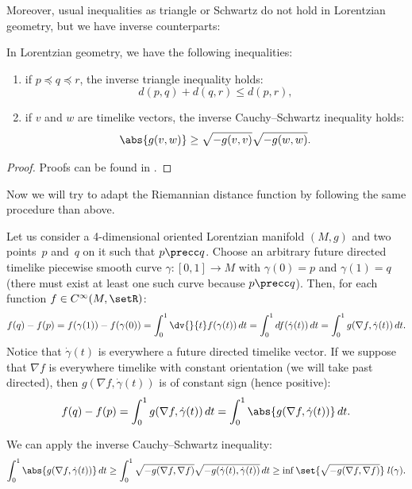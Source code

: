 Moreover, usual inequalities as triangle or Schwartz do not hold in Lorentzian geometry, but we have inverse counterparts:

\begin{lemma}
In Lorentzian geometry, we have the following inequalities:
\begin{enumerate}\itemsep=0pt
\item if $p \preceq q \preceq r$, the inverse triangle inequality holds:
\[
d(p,q) + d(q,r) \leq d(p,r),
\]
\item if $v$ and $w$ are timelike vectors, the inverse Cauchy--Schwartz inequality holds:
\[
\abs{g(v,w)} \geq \sqrt{- g(v,v)} \sqrt{- g(w,w)}.
\]
\end{enumerate}
\end{lemma}

\begin{proof}
Proofs can be found in \cite{Beem,ONeill}.
\end{proof}

Now we will try to adapt the Riemannian distance function by following the same procedure than above.

Let us consider a 4-dimensional oriented Lorentzian manifold $(M,g)$ and two points~$p$ and~$q$ on it such that $p \precc q$. Choose an arbitrary future directed timelike piecewise smooth curve $\gamma : [0,1] \rightarrow M$ with $\gamma(0) = p$ and $\gamma(1) = q$ (there must exist at least one such curve because $p \precc q$). Then, for each function $f \in C^\infty(M,\setR)$:
\begin{gather*}
f(q) - f(p) = f(\gamma(1)) - f(\gamma(0)) = \int_0^1 \dv{}{t} f(\gamma(t)) \, dt = \int_0^1 df(\dot\gamma(t)) \, dt = \int_0^1  g( \nabla f,\dot\gamma(t)) \, dt.
\end{gather*}
Notice that $\dot\gamma(t)$ is everywhere a future directed timelike vector. If we suppose that $\nabla f$ is everywhere timelike with constant orientation (we will take past directed), then $g( \nabla f,\dot\gamma(t))$ is of constant sign (hence positive):
\[
f(q) - f(p) = \int_0^1  g( \nabla f,\dot\gamma(t)) \, dt = \int_0^1 \abs{ g( \nabla f,\dot\gamma(t)) }\, dt.
\]


We can apply the inverse Cauchy--Schwartz inequality:
\begin{gather*}
\int_0^1  \abs{g( \nabla f,\dot\gamma(t))} \, dt  \geq \int_0^1  \sqrt{-g(\nabla f,\nabla f)} \sqrt{-g(\dot\gamma(t),\dot\gamma(t))} \, dt  \geq  \inf\set{{\sqrt{-g(\nabla f,\nabla f)}}}\; l(\gamma).
\end{gather*}

